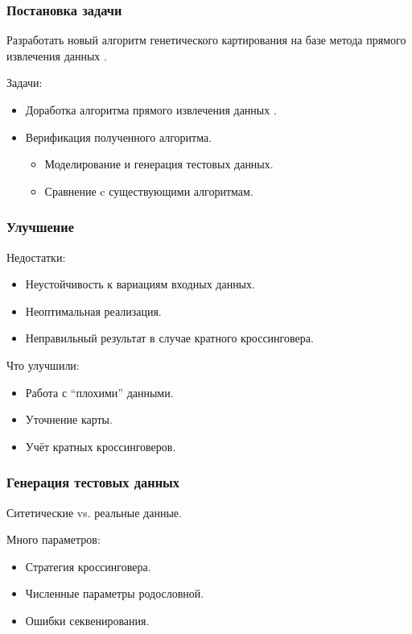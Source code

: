 \documentclass{beamer}
\begin{document}
\begin{frame}
  \frametitle{Постановка задачи}
  Разработать новый алгоритм генетического картирования на базе метода
  прямого извлечения данных \genmap.

  \medskip

  Задачи:
  \begin{itemize}
  \item Доработка алгоритма прямого извлечения данных \genmap.
  \item Верификация полученного алгоритма.
    \begin{itemize}
    \item Моделирование и генерация тестовых данных.
    \item Сравнение c существующими алгоритмам.
    \end{itemize}
  \end{itemize}
\end{frame}

\begin{frame}
  \frametitle{Улучшение \genmap}

  Недостатки:
  \begin{itemize}
  \item Неустойчивость к вариациям входных данных.
  \item Неоптимальная реализация.
  \item Неправильный результат в случае кратного кроссинговера.
  \end{itemize}

  Что улучшили:
  \begin{itemize}
  \item Работа с ``плохими'' данными.
  \item Уточнение карты.
  \item Учёт кратных кроссинговеров.
  \end{itemize}
\end{frame}

\begin{frame}
  \frametitle{Генерация тестовых данных}
  Ситетические vs. реальные данные.

  Много параметров:
  \begin{itemize}
  \item Стратегия кроссинговера.
  \item Численные параметры родословной.
  \item Ошибки секвенирования.
  \end{itemize}
\end{frame}
\end{document}

